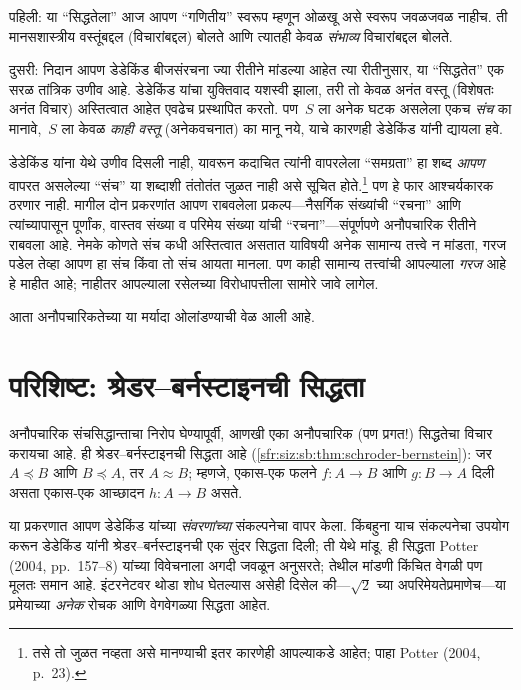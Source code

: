 \documentclass[11pt,a4paper,openany]{book}
\theoremstyle{definition}
\newcommand{\cardle}[2]{#1 \preceq #2}
\newcommand{\cardeq}[2]{#1 \approx #2}
\begin{document}
पहिली: या ``सिद्धतेला'' आज आपण ``गणितीय'' स्वरूप म्हणून ओळखू असे स्वरूप
जवळजवळ नाहीच. ती मानसशास्त्रीय वस्तूंबद्दल (विचारांबद्दल) बोलते आणि
त्यातही केवळ \emph{संभाव्य} विचारांबद्दल बोलते.

दुसरी: निदान आपण डेडेकिंड बीजसंरचना ज्या रीतीने मांडल्या आहेत त्या
रीतीनुसार, या ``सिद्धतेत'' एक सरळ तांत्रिक उणीव आहे. डेडेकिंड यांचा
युक्तिवाद यशस्वी झाला, तरी तो केवळ अनंत वस्तू (विशेषतः अनंत विचार)
अस्तित्वात आहेत एवढेच प्रस्थापित करतो. पण~$S$ ला अनेक घटक असलेला
एकच \emph{संच} का मानावे,~$S$ ला केवळ \emph{काही वस्तू} (अनेकवचनात) का मानू
नये, याचे कारणही डेडेकिंड यांनी द्यायला हवे.

डेडेकिंड यांना येथे उणीव दिसली नाही, यावरून कदाचित त्यांनी वापरलेला
``समग्रता'' हा शब्द \emph{आपण} वापरत असलेल्या ``संच'' या शब्दाशी
तंतोतंत जुळत नाही असे सूचित होते.\footnote{तसे तो जुळत नव्हता असे
मानण्याची इतर कारणेही आपल्याकडे आहेत; पाहा Potter (2004, p.~23).}
पण हे फार आश्चर्यकारक ठरणार नाही. मागील दोन प्रकरणांत आपण राबवलेला
प्रकल्प---नैसर्गिक संख्यांची ``रचना'' आणि त्यांच्यापासून पूर्णांक,
वास्तव संख्या व परिमेय संख्या यांची ``रचना''---संपूर्णपणे अनौपचारिक
रीतीने राबवला आहे. नेमके कोणते संच कधी अस्तित्वात असतात याविषयी अनेक
सामान्य तत्त्वे न मांडता, गरज पडेल तेव्हा आपण हा संच किंवा तो संच आयता
मानला. पण काही सामान्य तत्त्वांची आपल्याला \emph{गरज} आहे हे माहीत आहे;
नाहीतर आपल्याला रसेलच्या विरोधापत्तीला सामोरे जावे लागेल.

 आता अनौपचारिकतेच्या या मर्यादा ओलांडण्याची वेळ आली आहे.








\section{परिशिष्ट: श्रेडर--बर्नस्टाइनची सिद्धता}\label{sfr:infinite:card-sb:sec}

अनौपचारिक संचसिद्धान्ताचा निरोप घेण्यापूर्वी, आणखी एका अनौपचारिक
(पण प्रगत!) सिद्धतेचा विचार करायचा आहे. ही श्रेडर--बर्नस्टाइनची सिद्धता
आहे (\ref{sfr:siz:sb:thm:schroder-bernstein}): जर
$\cardle{A}{B}$ आणि $\cardle{B}{A}$, तर $\cardeq{A}{B}$; म्हणजे,
एकास-एक फलने $f \colon A \to B$ आणि $g \colon B \to A$ दिली असता
एकास-एक आच्छादन $h \colon A \to B$ असते.

या प्रकरणात आपण डेडेकिंड यांच्या \emph{संवरणांच्या} संकल्पनेचा वापर
केला. किंबहुना याच संकल्पनेचा उपयोग करून डेडेकिंड यांनी
श्रेडर--बर्नस्टाइनची एक सुंदर सिद्धता दिली; ती येथे मांडू. ही सिद्धता
Potter (2004, pp.~157--8) यांच्या विवेचनाला अगदी जवळून अनुसरते;
तेथील मांडणी किंचित वेगळी पण मूलतः समान आहे. इंटरनेटवर थोडा शोध
घेतल्यास असेही दिसेल की---$\sqrt{2}$ च्या अपरिमेयतेप्रमाणेच---या
प्रमेयाच्या \emph{अनेक} रोचक आणि वेगवेगळ्या सिद्धता आहेत.
\end{document}
